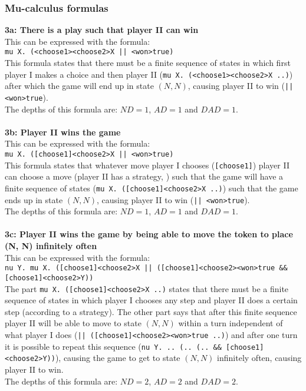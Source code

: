 \documentclass[10pt,a4paper]{article}
\begin{document}
\subsubsection{Mu-calculus formulas}
\textbf{3a: There is a play such that player II can win}\\
This can be expressed with the formula:\\
{\tt mu X. (<choose1><choose2>X || <won>true)}\\
This formula states that there must be a finite sequence of states in which first player I makes a choice and then player II ({\tt mu X. (<choose1><choose2>X ..)}) after which the game will end up in state $(N, N)$, causing player II to win ({\tt || <won>true}).\\
The depths of this formula are: $ND = 1$, $AD = 1$ and $DAD = 1$.
\\\\
\textbf{3b: Player II wins the game}\\
This can be expressed with the formula:\\
{\tt mu X. ([choose1]<choose2>X || <won>true)}\\
This formula states that whatever move player I chooses ({\tt [choose1]}) player II can choose a move (player II has a strategy, {\tt <choose2>}) such that the game will have a finite sequence of states ({\tt mu X. ([choose1]<choose2>X ..)}) such that the game ends up in state $(N, N)$, causing player II to win ({\tt || <won>true}).\\
The depths of this formula are: $ND = 1$, $AD = 1$ and $DAD = 1$.
\\\\
\textbf{3c: Player II wins the game by being able to move the token to place (N, N) infinitely often}\\
This can be expressed with the formula:\\
{\tt nu Y. mu X. ([choose1]<choose2>X || ([choose1]<choose2><won>true \&\& [choose1]<choose2>Y))}\\
The part {\tt mu X. ([choose1]<choose2>X ..)} states that there must be a finite sequence of states in which player I chooses any step and player II does a certain step (according to a strategy). The other part says that after this finite sequence player II will be able to move to state $(N, N)$ within a turn independent of what player I does ({\tt || ([choose1]<choose2><won>true ..)}) and after one turn it is possible to repeat this sequence ({\tt nu Y. .. (.. (.. \&\& [choose1]<choose2>Y))}), causing the game to get to state $(N, N)$ infinitely often, causing player II to win.\\
The depths of this formula are: $ND = 2$, $AD = 2$ and $DAD = 2$.
\end{document}
